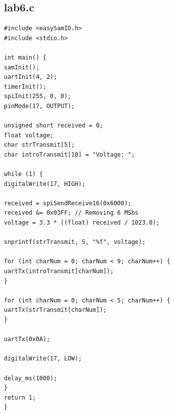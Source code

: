 \documentclass[12pt]{article}
\begin{document}
\pagebreak
\subsection{lab6.c}
\begin{scriptsize}
\begin{verbatim}
#include <easySamIO.h>
#include <stdio.h>

int main() {
samInit();
uartInit(4, 2);
timerInit();
spiInit(255, 0, 0);
pinMode(17, OUTPUT);

unsigned short received = 0;
float voltage;
char strTransmit[5];
char introTransmit[10] = "Voltage: ";

while (1) {
digitalWrite(17, HIGH);

received = spiSendReceive16(0x6000);
received &= 0x03FF; // Removing 6 MSbs
voltage = 3.3 * ((float) received / 1023.0);

snprintf(strTransmit, 5, "%f", voltage);

for (int charNum = 0; charNum < 9; charNum++) {
uartTx(introTransmit[charNum]);
}

for (int charNum = 0; charNum < 5; charNum++) {
uartTx(strTransmit[charNum]);
}

uartTx(0x0A);

digitalWrite(17, LOW);

delay_ms(1000);
}
return 1;
}
\end{verbatim}
\end{scriptsize}
	
\end{document}
